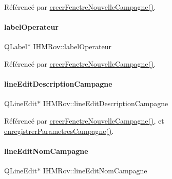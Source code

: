 Référencé par \hyperlink{class_i_h_m_rov_a08bf623a890df272f738c1ff8631213f}{creer\+Fenetre\+Nouvelle\+Campagne()}.

\mbox{\label{class_i_h_m_rov_a1855235995ed076748b568a1702355c9}} 
\paragraph{\texorpdfstring{label\+Operateur}{labelOperateur}}
{\footnotesize\ttfamily Q\+Label$\ast$ I\+H\+M\+Rov\+::label\+Operateur\hspace{0.3cm}{\ttfamily [private]}}



Référencé par \hyperlink{class_i_h_m_rov_a08bf623a890df272f738c1ff8631213f}{creer\+Fenetre\+Nouvelle\+Campagne()}.

\mbox{\label{class_i_h_m_rov_aedf9fd0d893326f970aa1b73dbe06e85}} 
\paragraph{\texorpdfstring{line\+Edit\+Description\+Campagne}{lineEditDescriptionCampagne}}
{\footnotesize\ttfamily Q\+Line\+Edit$\ast$ I\+H\+M\+Rov\+::line\+Edit\+Description\+Campagne\hspace{0.3cm}{\ttfamily [private]}}



Référencé par \hyperlink{class_i_h_m_rov_a08bf623a890df272f738c1ff8631213f}{creer\+Fenetre\+Nouvelle\+Campagne()}, et \hyperlink{class_i_h_m_rov_a229194814bfb1fc94ab3cc86d6411921}{enregistrer\+Parametres\+Campagne()}.

\mbox{\label{class_i_h_m_rov_a3b3dac7166ab414832dea0b5ad1a570d}} 
\paragraph{\texorpdfstring{line\+Edit\+Nom\+Campagne}{lineEditNomCampagne}}
{\footnotesize\ttfamily Q\+Line\+Edit$\ast$ I\+H\+M\+Rov\+::line\+Edit\+Nom\+Campagne\hspace{0.3cm}{\ttfamily [private]}}



